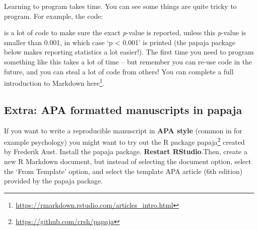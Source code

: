 \documentclass[
  oneside]{krantz}
\makeatletter
\newenvironment{Shaded}{\begin{snugshade}}{\end{snugshade}}
\newcommand{\AttributeTok}[1]{\textcolor[rgb]{0.61,0.61,0.61}{#1}}
\newcommand{\DecValTok}[1]{\textcolor[rgb]{0.06,0.06,0.06}{#1}}
\newcommand{\FloatTok}[1]{\textcolor[rgb]{0.06,0.06,0.06}{#1}}
\newcommand{\FunctionTok}[1]{\textcolor[rgb]{0,0,0}{#1}}
\newcommand{\NormalTok}[1]{#1}
\newcommand{\SpecialCharTok}[1]{\textcolor[rgb]{0,0,0}{#1}}
\newcommand{\StringTok}[1]{\textcolor[rgb]{0.5,0.5,0.5}{#1}}
\renewcommand{\href}[2]{#2\footnote{\url{#1}}}
\newenvironment{kframe}{%
\medskip{}
\setlength{\fboxsep}{.8em}
 \def\at@end@of@kframe{}%
 \ifinner\ifhmode%
  \def\at@end@of@kframe{\end{minipage}}%
  \begin{minipage}{\columnwidth}%
 \fi\fi%
 \def\FrameCommand##1{\hskip\@totalleftmargin \hskip-\fboxsep
 \colorbox{shadecolor}{##1}\hskip-\fboxsep
     \hskip-\linewidth \hskip-\@totalleftmargin \hskip\columnwidth}%
 \MakeFramed {\advance\hsize-\width
   \@totalleftmargin\z@ \linewidth\hsize
   \@setminipage}}%
 {\par\unskip\endMakeFramed%
 \at@end@of@kframe}
\renewenvironment{Shaded}{\begin{kframe}}{\end{kframe}}
\makeatother
\begin{document}
Learning to program takes time. You can see some things are quite tricky to
program. For example, the code:

\begin{Shaded}
\end{Shaded}

is a lot of code to make sure the exact \emph{p}-value is reported, unless this
\emph{p}-value is smaller than 0.001, in which case `p \textless{} 0.001' is printed (the papaja
package below makes reporting statistics a lot easier!). The first time you need
to program something like this takes a lot of time -- but remember you can re-use
code in the future, and you can steal a lot of code from others! You can
complete a full introduction to Markdown
\href{https://rmarkdown.rstudio.com/articles_intro.html}{here}.

\hypertarget{extra-apa-formatted-manuscripts-in-papaja}{%
\subsection{Extra: APA formatted manuscripts in papaja}\label{extra-apa-formatted-manuscripts-in-papaja}}

If you want to write a reproducible manuscript in \textbf{APA style} (common in for
example psychology) you might want to try out the R package
\href{https://github.com/crsh/papaja}{papaja} created by Frederik Aust. Install the
papaja package. \textbf{Restart RStudio}.Then, create a new R Markdown document, but
instead of selecting the document option, select the `From Template' option, and
select the template APA article (6th edition) provided by the papaja package.
\end{document}
